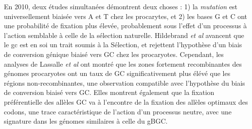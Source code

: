 En 2010, deux études simultanées\cite{hildebrand_evidence_2010,
	hershberg_evidence_2010} démontrent deux choses : 1) la \emph{mutation}
est universellement biaisée vers A et T chez les procarytes, et 2) les bases G
et C ont une probabilité de fixation plus élevée, probablement sous l'effet
d'un processus à l'action semblable à celle de la sélection naturelle.
Hildebrand \emph{et al} avancent que le \ac{gc} est en soi un trait soumis à la
Sélection, et rejettent l'hypothèse d'un biais de conversion génique biaisé
vers GC chez les procaryotes. Cependant, les analyses de Lassalle \emph{et al}
\cite{lassalle_gc-content_2015} ont montré que les zones fortement
recombinantes des génomes procaryotes ont un taux de GC significativement plus
élévé que les régions non-recombinantes, une observation compatible avec
l'hypothèse du biais de conversion biaisé vers GC. Elles montrent également que
la fixation préférentielle des allèles GC va à l'encontre de la fixation des
allèles optimaux des codons, une trace caractéristique de l'action d'un
processus neutre, avec une signature dans les génomes similaires à celle du
gBGC. %

